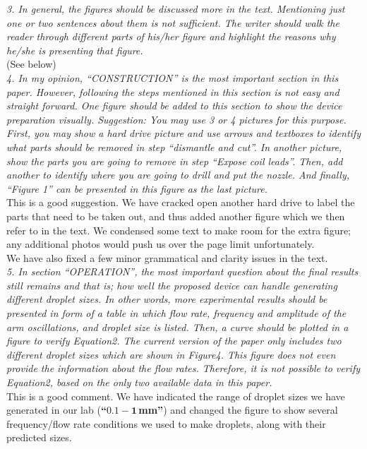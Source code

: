 \documentclass[]{article} %
\begin{document}
\textit{3. In general, the figures should be discussed more in the text. Mentioning just one or two sentences about them is not sufficient. The writer should walk the reader 
through different parts of his/her figure and highlight the reasons why he/she
is presenting that figure.}\\[2ex]

(See below)\\[2ex]

\textit{4. In my opinion, “CONSTRUCTION” is the most important section in this paper. However, following the steps mentioned in this section is not easy and straight forward. One figure should be added to this section to show the device preparation visually.
Suggestion: You may use 3 or 4 pictures for this purpose. First, you may show a
hard drive picture and use arrows and textboxes to identify what parts should be
removed in step “dismantle and cut”. In another picture, show the parts you are
going to remove in step “Expose coil leads”. Then, add another to identify where
you are going to drill and put the nozzle. And finally, “Figure 1” can be
presented in this figure as the last picture.}\\[2ex]

This is a good suggestion. We have cracked open another hard drive to label the
parts that need to be taken out, and thus added another figure which we then
refer to in the text. We condensed some text to make room for the extra figure;
any additional photos would push us over the page limit unfortunately.\\[2ex]

We have also fixed a few minor grammatical and clarity issues in the text.\\[2ex]

\textit{5. In section “OPERATION”, the most important question about the final results still remains and that is; how well the proposed device can handle generating different droplet sizes. In other words, more experimental results should be presented in form of a table in which flow rate, frequency and amplitude of the arm oscillations, and droplet size is listed. Then, a curve should be plotted in a figure to verify Equation2.
The current version of the paper only includes two different droplet sizes which
are shown in Figure4. This figure does not even provide the information about
the flow rates. Therefore, it is not possible to verify Equation2, based on the
only two available data in this paper.}\\[2ex]

This is a good comment. We have indicated the range of droplet sizes we have
generated in our lab (\textbf{``$\mathbf{0.1-1}\,$mm''}) and changed the figure to show
several frequency/flow rate conditions we used to make droplets, along with
their predicted sizes.
\end{document}
